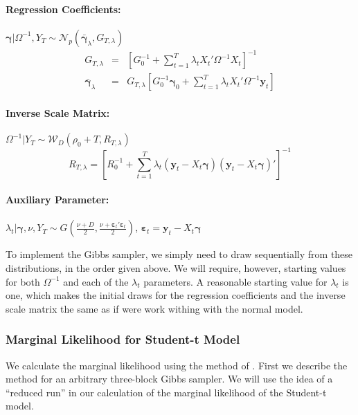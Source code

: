 \documentclass[12pt]{article}
\begin{document}
\paragraph{Regression Coefficients:} 
$\boldsymbol{\gamma}|\Omega^{-1},Y_T \sim \mathcal{N}_p\left( \bar{\boldsymbol{\gamma}}_{\lambda},G_{T,\lambda} \right)$
\begin{eqnarray*}
	G_{T,\lambda} &=& \left[ G_0^{-1} + \sum_{t=1}^T \lambda_t X_t' \Omega^{-1} X_t \right]^{-1}\\
	\bar{\boldsymbol{\gamma}}_{\lambda} &=& G_{T,\lambda} \left[ G_0^{-1}\boldsymbol{\gamma}_0 + \sum_{t=1}^{T}\lambda_t X_t'\Omega^{-1}\mathbf{y}_t \right]
\end{eqnarray*}
\paragraph{Inverse Scale Matrix:}
$\Omega^{-1}|Y_T \sim \mathcal{W}_D\left(\rho_0 + T, R_{T,\lambda}\right)$
\begin{equation*}
R_{T,\lambda} = \left[ R_0^{-1} + \sum_{t=1}^{T} \lambda_t\left( \mathbf{y}_t - X_t \boldsymbol{\gamma} \right)\left( \mathbf{y}_t - X_t \boldsymbol{\gamma} \right)' \right]^{-1}
\end{equation*}

\paragraph{Auxiliary Parameter:} $\lambda_t|\boldsymbol{\gamma}, \nu, Y_T \sim G\left(\displaystyle \frac{\nu + D}{2}, \frac{\nu + \boldsymbol{\varepsilon}_t' \boldsymbol{\varepsilon}_t}{2} \right)$, $\boldsymbol{\varepsilon}_t = \mathbf{y}_t - X_t \boldsymbol{\gamma}$

To implement the Gibbs sampler, we simply need to draw sequentially from these distributions, in the order given above. 
We will require, however, starting values for both $\Omega^{-1}$ and each of the $\lambda_t$ parameters. 
A reasonable starting value for $\lambda_t$ is one, which makes the initial draws for the regression coefficients and the inverse scale matrix the same as if were work withing with the normal model.

\subsubsection{Marginal Likelihood for Student-t Model}
 We calculate the marginal likelihood using the method of \cite{chib1995marginal}. First we describe the method for an arbitrary three-block Gibbs sampler. 
 We will use the idea of a ``reduced run'' in our calculation of the marginal likelihood of the Student-t model.\\
\end{document}
